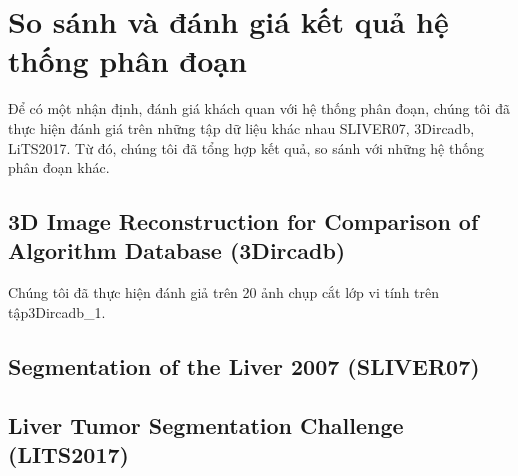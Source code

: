 \chapter{So sánh và đánh giá kết quả hệ thống phân đoạn}
Để có một nhận định, đánh giá khách quan với hệ thống phân đoạn, chúng tôi đã thực hiện đánh giá trên những tập dữ liệu khác nhau SLIVER07, 3Dircadb,  LiTS2017. Từ đó, chúng tôi đã tổng hợp kết quả, so sánh với những hệ thống phân đoạn khác.
\section{3D Image Reconstruction for Comparison of Algorithm Database (3Dircadb)}
Chúng tôi đã thực hiện đánh giả trên 20 ảnh chụp cắt lớp vi tính trên tập3Dircadb\_1. 
\section{Segmentation of the Liver 2007 (SLIVER07)}

\section{Liver Tumor Segmentation Challenge (LITS2017)}
